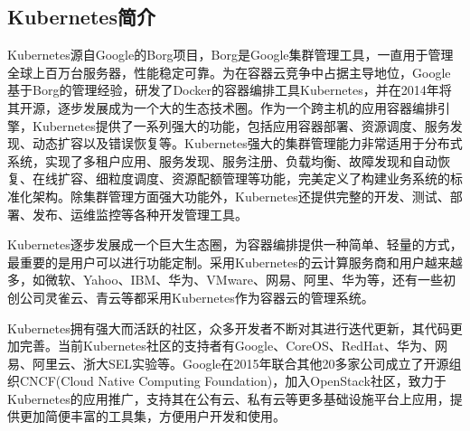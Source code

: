 \subsection{Kubernetes简介}
Kubernetes源自Google的Borg项目，Borg是Google集群管理工具，一直用于管理全球上百万台服务器，性能稳定可靠。为在容器云竞争中占据主导地位，Google基于Borg的管理经验，研发了Docker的容器编排工具Kubernetes，并在2014年将其开源，逐步发展成为一个大的生态技术圈。作为一个跨主机的应用容器编排引擎，Kubernetes提供了一系列强大的功能，包括应用容器部署、资源调度、服务发现、动态扩容以及错误恢复等。Kubernetes强大的集群管理能力非常适用于分布式系统，实现了多租户应用、服务发现、服务注册、负载均衡、故障发现和自动恢复、在线扩容、细粒度调度、资源配额管理等功能，完美定义了构建业务系统的标准化架构。除集群管理方面强大功能外，Kubernetes还提供完整的开发、测试、部署、发布、运维监控等各种开发管理工具。

Kubernetes逐步发展成一个巨大生态圈，为容器编排提供一种简单、轻量的方式，最重要的是用户可以进行功能定制。采用Kubernetes的云计算服务商和用户越来越多，如微软、Yahoo、IBM、华为、VMware、网易、阿里、华为等，还有一些初创公司灵雀云、青云等都采用Kubernetes作为容器云的管理系统。

Kubernetes拥有强大而活跃的社区，众多开发者不断对其进行迭代更新，其代码更加完善。当前Kubernetes社区的支持者有Google、CoreOS、RedHat、华为、网易、阿里云、浙大SEL实验等。Google在2015年联合其他20多家公司成立了开源组织CNCF(Cloud Native Computing Foundation)，加入OpenStack社区，致力于Kubernetes的应用推广，支持其在公有云、私有云等更多基础设施平台上应用，提供更加简便丰富的工具集，方便用户开发和使用。

